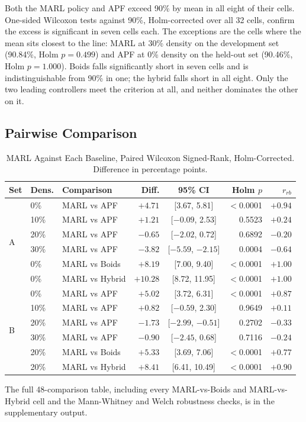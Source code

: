 \documentclass[a4paper, 10pt, conference]{ieeeconf}
\begin{document}
Both the MARL policy and APF exceed 90\% by mean in all eight of
their cells. One-sided Wilcoxon tests against 90\%, Holm-corrected
over all 32 cells, confirm the excess is significant in seven cells
each. The exceptions are the cells where the mean sits closest to the
line: MARL at 30\% density on the development set (90.84\%, Holm
$p = 0.499$) and APF at 0\% density on the held-out set (90.46\%,
Holm $p = 1.000$). Boids falls significantly short in seven cells and
is indistinguishable from 90\% in one; the hybrid falls short in all
eight. Only the two leading controllers meet the criterion at all,
and neither dominates the other on it.

\subsection{Pairwise Comparison}\label{sec:pairwise}

\begin{table}[htb]
\centering
\caption{MARL Against Each Baseline, Paired Wilcoxon Signed-Rank,
Holm-Corrected. Difference in percentage points.}
\label{tab:stats}
\scriptsize
\setlength{\tabcolsep}{1.6pt}
\begin{tabular}{lllrcrr}
\toprule
\textbf{Set} & \textbf{Dens.} & \textbf{Comparison} & \textbf{Diff.} &
\textbf{95\% CI} & \textbf{Holm $p$} & \textbf{$r_{rb}$} \\
\midrule
\multirow{6}{*}{A}
& 0\%  & MARL vs APF    & $+4.71$  & [3.67, 5.81]        & $<$0.0001 & $+0.94$ \\
& 10\% & MARL vs APF    & $+1.21$  & [$-0.09$, 2.53]     & 0.5523    & $+0.24$ \\
& 20\% & MARL vs APF    & $-0.65$  & [$-2.02$, 0.72]     & 0.6892    & $-0.20$ \\
& 30\% & MARL vs APF    & $-3.82$  & [$-5.59$, $-2.15$]  & 0.0004    & $-0.64$ \\
& 0\%  & MARL vs Boids  & $+8.19$  & [7.00, 9.40]        & $<$0.0001 & $+1.00$ \\
& 0\%  & MARL vs Hybrid & $+10.28$ & [8.72, 11.95]       & $<$0.0001 & $+1.00$ \\
\midrule
\multirow{6}{*}{B}
& 0\%  & MARL vs APF    & $+5.02$  & [3.72, 6.31]        & $<$0.0001 & $+0.87$ \\
& 10\% & MARL vs APF    & $+0.82$  & [$-0.59$, 2.30]     & 0.9649    & $+0.11$ \\
& 20\% & MARL vs APF    & $-1.73$  & [$-2.99$, $-0.51$]  & 0.2702    & $-0.33$ \\
& 30\% & MARL vs APF    & $-0.90$  & [$-2.45$, 0.68]     & 0.7116    & $-0.24$ \\
& 20\% & MARL vs Boids  & $+5.33$  & [3.69, 7.06]        & $<$0.0001 & $+0.77$ \\
& 20\% & MARL vs Hybrid & $+8.41$  & [6.41, 10.49]       & $<$0.0001 & $+0.90$ \\
\bottomrule
\end{tabular}

\vspace{0.3em}
{\footnotesize The full 48-comparison table, including every
MARL-vs-Boids and MARL-vs-Hybrid cell and the Mann-Whitney and Welch
robustness checks, is in the supplementary output.}
\end{table}
\end{document}
